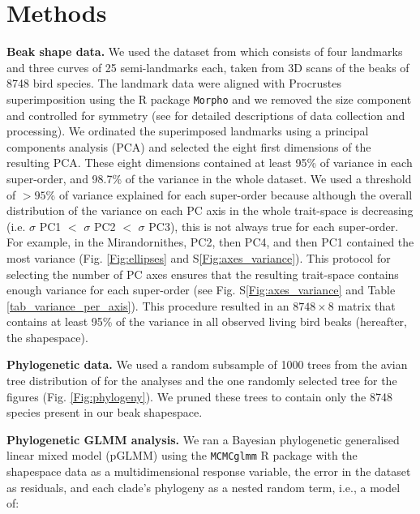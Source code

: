 \documentclass[12pt,letterpaper]{article}
\begin{document}
\section{Methods}


\textbf{Beak shape data.}
We used the dataset from \cite{cooney2017mega,chira2020signature,hughes2022global} which consists of four landmarks and three curves of 25 semi-landmarks each, taken from 3D scans of  the beaks of 8748 bird species.
The landmark data were aligned with Procrustes superimposition using the R package \texttt{Morpho} \cite{Rcore,Morpho} and we removed the size component and controlled for symmetry (see \cite{cooney2017mega,chira2020signature,hughes2022global} for detailed descriptions of data collection and processing).
We ordinated the superimposed landmarks using a principal components analysis (PCA) and selected the eight first dimensions of the resulting PCA.
These eight dimensions contained at least 95\% of variance in each super-order, and 98.7\% of the variance in the whole dataset.
We used a threshold of $>95$\% of variance explained for each super-order because although the overall distribution of the variance on each PC axis in the whole trait-space is decreasing (i.e.
$\sigma$ PC1 $<$ $\sigma$ PC2 $<$ $\sigma$ PC3), this is not always true for each super-order.
For example, in the Mirandornithes, PC2, then PC4, and then PC1 contained the most variance (Fig. \ref{Fig:ellipses} and S\ref{Fig:axes_variance}).
This protocol for selecting the number of PC axes ensures that the resulting trait-space contains enough variance for each super-order (see Fig. S\ref{Fig:axes_variance} and Table \ref{tab_variance_per_axis}).
This procedure resulted in an $8748 \times 8$ matrix that contains at least 95\% of the variance in all observed living bird beaks (hereafter, the shapespace).

\textbf{Phylogenetic data.}
We used a random subsample of 1000 trees from the avian tree distribution of \cite{jetz2012global} for the analyses and the one randomly selected tree for the figures (Fig. \ref{Fig:phylogeny}).
We pruned these trees to contain only the 8748 species present in our beak shapespace.

\textbf{Phylogenetic GLMM analysis.}
We ran a Bayesian phylogenetic generalised linear mixed model (pGLMM) using the \texttt{MCMCglmm} R package \cite{MCMCglmm} with the shapespace data as a multidimensional response variable, the error in the dataset as residuals, and each clade's phylogeny as a nested random term, i.e., a model of:
\end{document}
